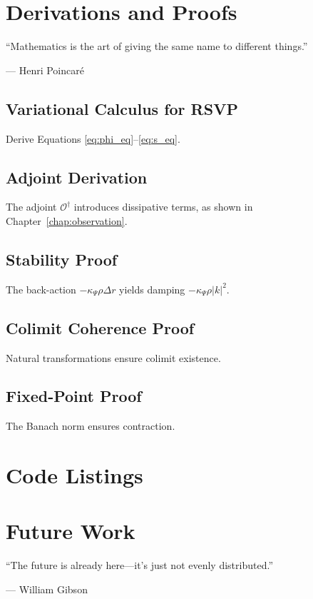 \documentclass[12pt]{book}
\theoremstyle{definition}
\begin{document}
\chapter{Derivations and Proofs}
\label{chap:derivations}
\epigraph{``Mathematics is the art of giving the same name to different things.''}{--- Henri Poincaré}

\section{Variational Calculus for RSVP}
Derive Equations \eqref{eq:phi_eq}–\eqref{eq:s_eq}.

\section{Adjoint Derivation}
The adjoint $\mathcal{O}^\dagger$ introduces dissipative terms, as shown in Chapter~\ref{chap:observation}.

\section{Stability Proof}
The back-action $-\kappa_\Psi \rho \Delta r$ yields damping $-\kappa_\Psi \rho |k|^2$.

\section{Colimit Coherence Proof}
Natural transformations ensure colimit existence.

\section{Fixed-Point Proof}
The Banach norm ensures contraction.

\chapter{Code Listings}
\label{chap:code}



\chapter*{Future Work}
\epigraph{``The future is already here—it’s just not evenly distributed.''}{--- William Gibson}
\end{document}
